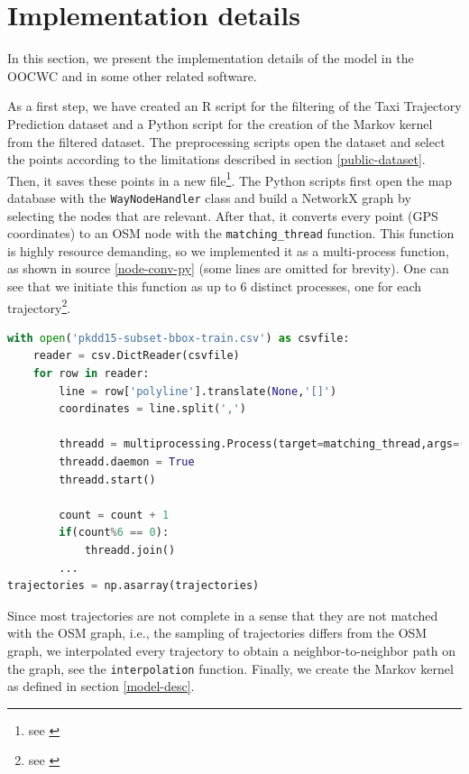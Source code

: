 \documentclass[b5paper,12pt]{report}
\theoremstyle{definition}
\begin{document}
\section{Implementation details}

In this section, we present the implementation details of the model in the OOCWC and in some other related software.

As a first step, we have created an R script for the filtering of the Taxi Trajectory Prediction dataset and a Python script for the creation of the Markov kernel from the filtered dataset. The preprocessing scripts open the dataset and select the points according to the limitations described in section \ref{public-dataset}. Then, it saves these points in a new file\footnote{see \cite[/model-sources/Preprocessing]{csts-repo}}. The Python scripts first open the map database with the \texttt{WayNodeHandler} class and build a NetworkX graph by selecting the nodes that are relevant. After that, it converts every point (GPS coordinates) to an OSM node with the \texttt{matching\_thread} function. This function is highly resource demanding, so we implemented it as a multi-process function, as shown in source \ref{node-conv-py} (some lines are omitted for brevity). One can see that we initiate this function as up to 6 distinct processes, one for each trajectory\footnote{see \cite[/model-sources/Markovkernel]{csts-repo}}.

\begin{lstlisting}[language=Python,caption=Multi-process processing of node conversion., label=node-conv-py, escapechar={|}]
with open('pkdd15-subset-bbox-train.csv') as csvfile:
    reader = csv.DictReader(csvfile)
    for row in reader:
        line = row['polyline'].translate(None,'[]')
        coordinates = line.split(',')
        
        threadd = multiprocessing.Process(target=matching_thread,args=(coordinates,))
        threadd.daemon = True
        threadd.start()
        
        count = count + 1
        if(count%6 == 0):
            threadd.join()
        ...
trajectories = np.asarray(trajectories)
\end{lstlisting}

Since most trajectories are not complete in a sense that they are not matched with the OSM graph, i.e., the sampling of trajectories differs from the OSM graph, we interpolated every trajectory to obtain a neighbor-to-neighbor path on the graph, see the \texttt{interpolation} function. Finally, we create the Markov kernel as defined in section \ref{model-desc}.
\end{document}
